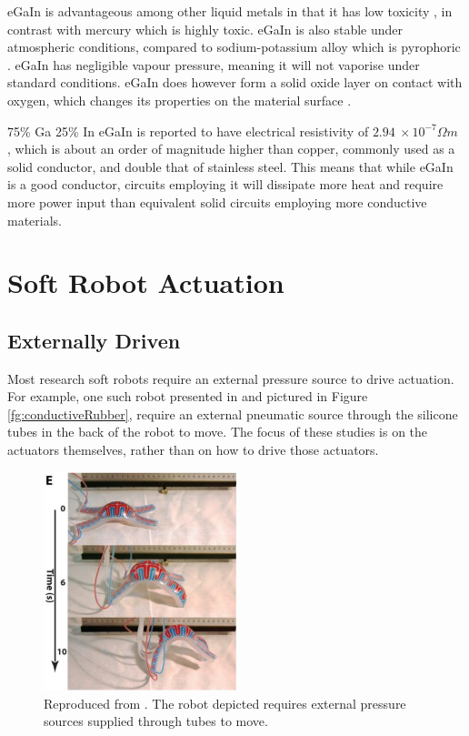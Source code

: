 \documentclass[a4paper,12pt]{article}
\begin{document}
eGaIn is advantageous among other liquid metals in that it has low toxicity \cite{dickeyEutecticGalliumIndiumEGaIn2008}, in contrast with mercury which is highly toxic. eGaIn is also stable under atmospheric conditions, compared to sodium-potassium alloy which is pyrophoric \cite{houghtonHazards2007}. eGaIn has negligible vapour pressure, meaning it will not vaporise under standard conditions. eGaIn does however form a solid oxide layer on contact with oxygen, which changes its properties on the material surface \cite{liuCharacterizationNontoxicLiquidMetal2012}.

75\% Ga 25\% In eGaIn  is reported to have electrical resistivity of $2.94\ \times10^{-7} \Omega m$ \cite{zrnicResistivitySurfaceTension1969}, which is about an order of magnitude higher than copper, commonly used as a solid conductor, and double that of stainless steel. This means that while eGaIn is a good conductor, circuits employing it will dissipate more heat and require more power input than equivalent solid circuits employing more conductive materials.

\section{Soft Robot Actuation}
\subsection{Externally Driven}
Most research soft robots require an external pressure source to drive actuation. For example, one such robot presented in \cite{morinCamouflageDisplaySoft2012} and pictured in Figure \ref{fg:conductiveRubber}, require an external pneumatic source through the silicone tubes in the back of the robot to move. The focus of these studies is on the actuators themselves, rather than on how to drive those actuators.

\begin{figure}[h!]
    \centering
    \includegraphics[width=0.5\textwidth]{externalpressure.png}
    \caption{Reproduced from \cite{morinCamouflageDisplaySoft2012}. The robot depicted requires external pressure sources supplied through tubes to move.}
    \label{fg:externalpressure}
\end{figure}
\end{document}
